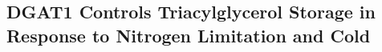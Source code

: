 \documentclass[10pt,letterpaper]{article}
\begin{document}








\subsection*{DGAT1 Controls Triacylglycerol Storage in Response to Nitrogen Limitation and Cold}
\end{document}
